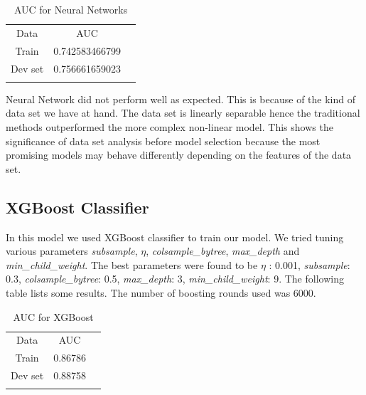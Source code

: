 \documentclass[conference]{IEEEtran}
\numberwithin{equation}{section}
\numberwithin{figure}{section}
\numberwithin{table}{section}
\begin{document}
\begin{table}[!htb]
 \centering
 \caption{AUC for Neural Networks}
 \label{tab_nn}
\begin{tabular}{ c c c } 
	    \noalign{\smallskip}\hline\noalign{\smallskip}
		Data &  AUC \\
    	   \noalign{\smallskip}\hline\noalign{\smallskip}
		Train &  0.742583466799\\
		Dev set &  0.756661659023\\
				\noalign{\smallskip}\hline\noalign{\smallskip}
  \end{tabular} 
\end{table}

Neural Network did not perform well as expected. This is because of the kind of data set we have at hand. The data set is linearly separable hence the traditional methods outperformed the more complex non-linear model. This shows the significance of data set analysis before model selection because the most promising models may behave differently depending on the features of the data set.  

\subsection{XGBoost Classifier}
In this model we used XGBoost classifier to train our model. We tried tuning various parameters \textit{subsample}, \textit{$\eta$}, \textit{colsample\_bytree}, \textit{max\_depth} and \textit{min\_child\_weight}. The best parameters were found to be \textit{$\eta$} : 0.001, \textit{subsample}: 0.3, \textit{colsample\_bytree}: 0.5, \textit{max\_depth}: 3, \textit{min\_child\_weight}: 9. The following table lists some results.  The number of boosting rounds used was 6000.
 
\begin{table}[!htb]
\centering
\caption{AUC for XGBoost}
\label{tab_lr}
\begin{tabular}{ c c c }
                    \noalign{\smallskip}\hline\noalign{\smallskip}
                                Data  & AUC \\
                   \noalign{\smallskip}\hline\noalign{\smallskip}
                                Train & 0.86786\\
                                Dev set  & 0.88758\\  
                                		\noalign{\smallskip}\hline\noalign{\smallskip}	                   
  \end{tabular}
\end{table}
 
\end{document}
